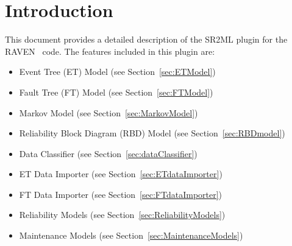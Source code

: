 \section{Introduction}
\label{sec:Introduction}

This document provides a detailed description of the SR2ML plugin for the RAVEN~\cite{RAVEN,RAVENtheoryMan} code.
The features included in this plugin are:
\begin{itemize}
	\item Event Tree (ET) Model (see Section~\ref{sec:ETModel})
	\item Fault Tree (FT) Model (see Section~\ref{sec:FTModel})
	\item Markov Model (see Section~\ref{sec:MarkovModel})
	\item Reliability Block Diagram (RBD) Model (see Section~\ref{sec:RBDmodel})
	\item Data Classifier (see Section~\ref{sec:dataClassifier})
	\item ET Data Importer (see Section~\ref{sec:ETdataImporter})
	\item FT Data Importer (see Section~\ref{sec:FTdataImporter})
	\item Reliability Models (see Section~\ref{sec:ReliabilityModels})
  \item Maintenance Models (see Section~\ref{sec:MaintenanceModels})
\end{itemize}
